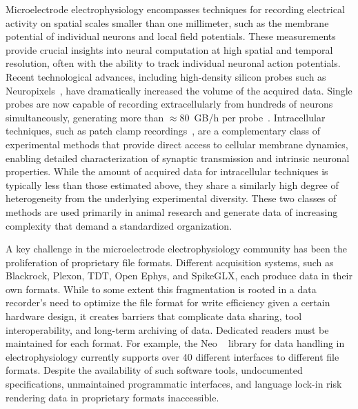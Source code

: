 \documentclass[fleqn,10pt]{article}
\newcommand{\rrid}[1]{\href{https://scicrunch.org/resolver/#1}{#1}}
\begin{document}
Microelectrode electrophysiology encompasses techniques for recording electrical activity on spatial scales smaller than one millimeter, such as the membrane potential of individual neurons and local field potentials.
These measurements provide crucial insights into neural computation at high spatial and temporal resolution, often with the ability to track individual neuronal action potentials.
Recent technological advances, including high-density silicon probes such as Neuropixels~\citep{jun_fully_2017, Steinmetz2021}, have dramatically increased the volume of the acquired data. 
Single probes are now capable of recording extracellularly from hundreds of neurons simultaneously, generating more than $\approx 80$~GB/h per probe~\citealp{Steinmetz2021}.
Intracellular techniques, such as patch clamp recordings~\citep{sakmann_patch_1984}, are a complementary class of experimental methods that provide direct access to cellular membrane dynamics, enabling detailed characterization of synaptic transmission and intrinsic neuronal properties.
While the amount of acquired data for intracellular techniques is typically less than those estimated above, they share a similarly high degree of heterogeneity from the underlying experimental diversity.
These two classes of methods are used primarily in animal research and generate data of increasing complexity that demand a standardized organization.

A key challenge in the microelectrode electrophysiology community has been the proliferation of proprietary file formats.
Different acquisition systems, such as Blackrock, Plexon, TDT, Open Ephys, and SpikeGLX, each produce data in their own formats.
While to some extent this fragmentation is rooted in a data recorder's need to optimize the file format for write efficiency given a certain hardware design, it creates barriers that complicate data sharing, tool interoperability, and long-term archiving of data. 
Dedicated readers must be maintained for each format. For example, the Neo ~\citep[\rrid{RRID:SCR\_000634}; ][]{garcia_neo_2014} library for data handling in electrophysiology currently supports over 40 different interfaces to different file formats. Despite the availability of such software tools, undocumented specifications, unmaintained programmatic interfaces, and language lock-in risk rendering data in proprietary formats inaccessible.
\end{document}
